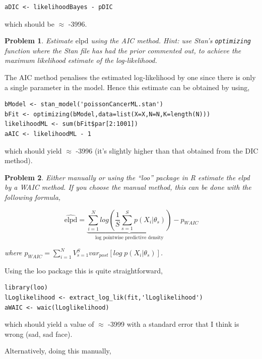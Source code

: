 \documentclass{article}
\newtheorem{problem}{Problem}[section]
\begin{document}
\begin{verbatim}
aDIC <- likelihoodBayes - pDIC
\end{verbatim}

which should be $\approx$ -3996.

\begin{problem}
	Estimate $\text{elpd}$ using the AIC method. Hint: use Stan's \texttt{optimizing} function where the Stan file has had the prior commented out, to achieve the maximum likelihood estimate of the log-likelihood.
\end{problem}

The AIC method penalises the estimated log-likelihood by one since there is only a single parameter in the model. Hence this estimate can be obtained by using,

\begin{verbatim}
bModel <- stan_model('poissonCancerML.stan')
bFit <- optimizing(bModel,data=list(X=X,N=N,K=length(N)))
likelihoodML <- sum(bFit$par[2:1001])
aAIC <- likelihoodML - 1
\end{verbatim}

which should yield $\approx$ -3996 (it's slightly higher than that obtained from the DIC method).



\begin{problem}
	Either manually or using the ``loo'' package in R estimate the elpd by a WAIC method. If you choose the manual method, this can be done with the following formula,
	
	\begin{equation}
	\widehat{\text{elpd}}  = \underbrace{\sum_{i=1}^{N} log\left(\frac{1}{S}\sum_{s=1}^{S} p(X_i|\theta_s)\right)}_{\text{log pointwise predictive density}} - p_{WAIC}
	\end{equation}
	
	where $p_{WAIC} =  \sum_{i=1}^{N}V_{s=1}^{S} var_{post} \left[log\; p(X_i|\theta_s)\right]$.
\end{problem}

Using the loo package this is quite straightforward,

\begin{verbatim}
library(loo)
lLoglikelihood <- extract_log_lik(fit,'lLoglikelihood')
aWAIC <- waic(lLoglikelihood)
\end{verbatim}

which should yield a value of $\approx$ -3999 with a standard error that I think is wrong (sad, sad face).

Alternatively, doing this manually,
\end{document}
